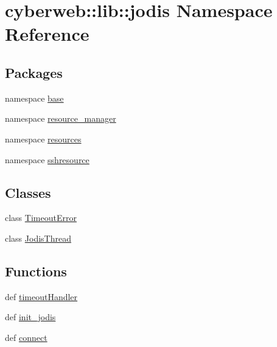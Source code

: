 \hypertarget{namespacecyberweb_1_1lib_1_1jodis}{\section{cyberweb\-:\-:lib\-:\-:jodis \-Namespace \-Reference}
\label{namespacecyberweb_1_1lib_1_1jodis}
}
\subsection*{\-Packages}
\begin{DoxyCompactItemize}
\item 
namespace \hyperlink{namespacecyberweb_1_1lib_1_1jodis_1_1base}{base}
\item 
namespace \hyperlink{namespacecyberweb_1_1lib_1_1jodis_1_1resource__manager}{resource\-\_\-manager}
\item 
namespace \hyperlink{namespacecyberweb_1_1lib_1_1jodis_1_1resources}{resources}
\item 
namespace \hyperlink{namespacecyberweb_1_1lib_1_1jodis_1_1sshresource}{sshresource}
\end{DoxyCompactItemize}
\subsection*{\-Classes}
\begin{DoxyCompactItemize}
\item 
class \hyperlink{classcyberweb_1_1lib_1_1jodis_1_1_timeout_error}{\-Timeout\-Error}
\item 
class \hyperlink{classcyberweb_1_1lib_1_1jodis_1_1_jodis_thread}{\-Jodis\-Thread}
\end{DoxyCompactItemize}
\subsection*{\-Functions}
\begin{DoxyCompactItemize}
\item 
def \hyperlink{namespacecyberweb_1_1lib_1_1jodis_aa681aa8f119cb62ff313a4e800d86b61}{timeout\-Handler}
\item 
def \hyperlink{namespacecyberweb_1_1lib_1_1jodis_a41a7241e1b04a3a6b9d4e48267063ebd}{init\-\_\-jodis}
\item 
def \hyperlink{namespacecyberweb_1_1lib_1_1jodis_a7a314f075d3a8910de5426e6237b4e68}{connect}
\end{DoxyCompactItemize}
